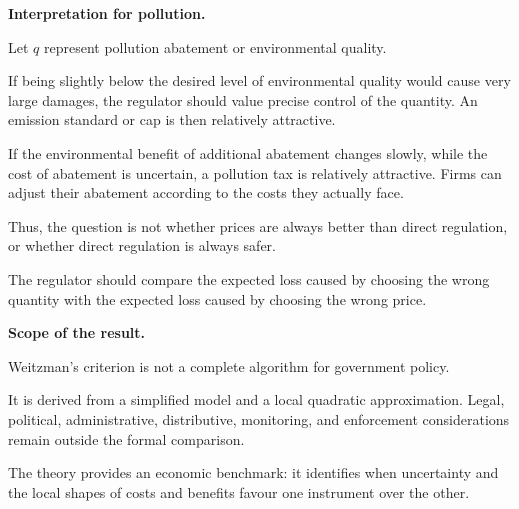 \medskip\noindent
{\bf Interpretation for pollution.}

Let $q$ represent pollution abatement or
environmental quality.

If being slightly below the desired level
of environmental quality would cause very
large damages, the regulator should value
precise control of the quantity. An
emission standard or cap is then relatively
attractive.

If the environmental benefit of additional
abatement changes slowly, while the cost
of abatement is uncertain, a pollution tax
is relatively attractive. Firms can adjust
their abatement according to the costs
they actually face.

Thus, the question is not whether prices
are always better than direct regulation,
or whether direct regulation is always
safer.

The regulator should compare the expected
loss caused by choosing the wrong quantity
with the expected loss caused by choosing
the wrong price.

\medskip\noindent
{\bf Scope of the result.}

Weitzman's criterion is not a complete
algorithm for government policy.

It is derived from a simplified model and
a local quadratic approximation. Legal,
political, administrative, distributive,
monitoring, and enforcement considerations
remain outside the formal comparison.

The theory provides an economic benchmark:
it identifies when uncertainty and the
local shapes of costs and benefits favour
one instrument over the other.





